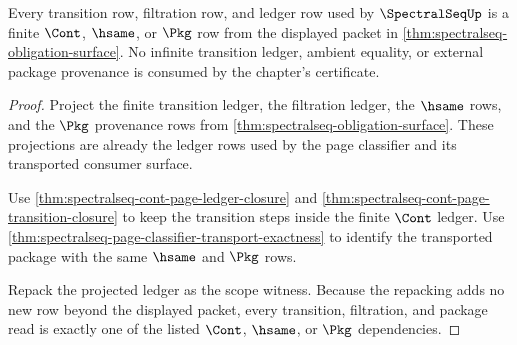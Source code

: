 \begin{theorem}
\label{thm:spectralseq-cont-pkg-ledger-scope-binding}
Every transition row, filtration row, and ledger row used by $\SpectralSeqUp$ is
a finite $\Cont$, $\hsame$, or $\Pkg$ row from the displayed packet in
\autoref{thm:spectralseq-obligation-surface}. No infinite transition ledger,
ambient equality, or external package provenance is consumed by the chapter's
certificate.
\end{theorem}
\begin{proof}
Project the finite transition ledger, the filtration ledger, the $\hsame$ rows,
and the $\Pkg$ provenance rows from
\autoref{thm:spectralseq-obligation-surface}. These projections are already the
ledger rows used by the page classifier and its transported consumer surface.

Use \autoref{thm:spectralseq-cont-page-ledger-closure} and
\autoref{thm:spectralseq-cont-page-transition-closure} to keep the
transition steps inside the finite $\Cont$ ledger. Use
\autoref{thm:spectralseq-page-classifier-transport-exactness} to identify the
transported package with the same $\hsame$ and $\Pkg$ rows.

Repack the projected ledger as the scope witness. Because the repacking adds no
new row beyond the displayed packet, every transition, filtration, and package
read is exactly one of the listed $\Cont$, $\hsame$, or $\Pkg$ dependencies.
\end{proof}

